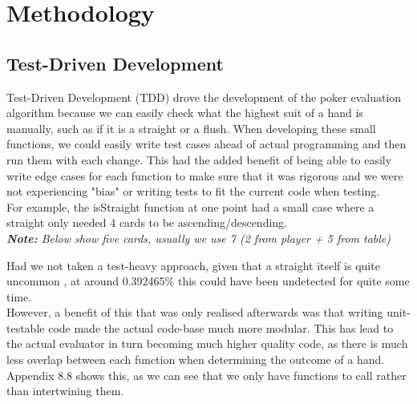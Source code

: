 \documentclass[11pt]{article}
\begin{document}
\newpage
\section{Methodology}

\subsection{Test-Driven Development}

Test-Driven Development (TDD) drove the development of the poker evaluation algorithm because we can easily check what the highest suit of a hand is manually, such as if it is a straight or a flush. When developing these small functions, we could easily write test cases ahead of actual programming and then run them with each change. This had the added benefit of being able to easily write edge cases for each function to make sure that it was rigorous and we were not experiencing "bias" or writing tests to fit the current code when testing.  \\

For example, the isStraight function at one point had a small case where a straight only needed 4 cards to be ascending/descending. \\

\textit{\textbf{Note:} Below show five cards, usually we use 7 (2 from player + 5 from table)} \\
\setlength{\fboxrule}{0pt}
\noindent{}%
\hfill%

Had we not taken a test-heavy approach, given that a straight itself is quite uncommon \cite{str_uncommon}, at around 0.392465\% this could have been undetected for quite some time. \\

However, a benefit of this that was only realised afterwards was that writing unit-testable code made the actual code-base much more modular. This has lead to the actual evaluator in turn becoming much higher quality code, as there is much less overlap between each function when determining the outcome of a hand.  Appendix 8.8 shows this, as we can see that we only have functions to call rather than intertwining them. 
\end{document}
